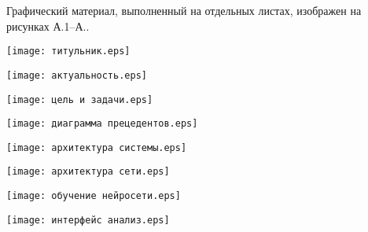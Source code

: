 
Графический материал, выполненный на отдельных листах,
изображен на рисунках А.1--А..
\setcounter{числоПлакатов}{0}

\renewcommand{\thefigure}{А.\arabic{figure}} %

\begin{landscape}

\begin{плакат}
    \texttt{[image: титульник.eps]}
    \label{pl1:image}      
\end{плакат}

\begin{плакат}
	\texttt{[image: актуальность.eps]}
	\label{pl12:image}      
\end{плакат}

\begin{плакат}
	\texttt{[image: цель и задачи.eps]}
	\label{pl2:image}      
\end{плакат}

\begin{плакат}
	\texttt{[image: диаграмма прецедентов.eps]}
	\label{pl3:image}      
\end{плакат}

\begin{плакат}
	\texttt{[image: архитектура системы.eps]}
	\label{pl4:image}      
\end{плакат}

\begin{плакат}
	\texttt{[image: архитектура сети.eps]}
	\label{pl5:image}      
\end{плакат}

\begin{плакат}
	\texttt{[image: обучение нейросети.eps]}
	\label{pl6:image}      
\end{плакат}

\begin{плакат}
	\texttt{[image: интерфейс анализ.eps]}
	\label{pl7:image}      
\end{плакат}


\end{landscape}
